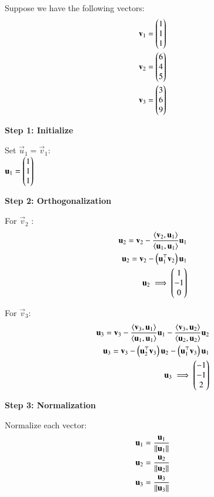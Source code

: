 \begin{enumerate}[label=\thesection.\arabic*,ref=\thesection.\theenumi]
    Suppose we have the following vectors:
    \begin{align*}
        \mathbf{v}_1 = \begin{pmatrix}1 \\1 \\1\end{pmatrix}  \\
        \mathbf{v}_2 = \begin{pmatrix}6\\ 4\\ 5\end{pmatrix}  \\
        \mathbf{v}_3 = \begin{pmatrix}3 \\6\\ 9\end{pmatrix}
    \end{align*}
        

\textbf{Step 1: Initialize}

Set $\vec{u}_1 = \vec{v}_1$:\\

 $\mathbf{u}_1 = \begin{pmatrix}1\\1\\1\end{pmatrix}$
 

\textbf{Step 2: Orthogonalization}

For  $ \vec{v}_2$ :
 \begin{align}
     \mathbf{u}_2 = \mathbf{v}_2 - \frac{\langle \mathbf{v}_2, \mathbf{u}_1 \rangle}{\langle \mathbf{u}_1, \mathbf{u}_1 \rangle} \mathbf{u}_1 \\
     \mathbf{u}_2=\mathbf{v}_2- \left(\mathbf{u}_1 ^\top \mathbf{v}_2\right) \mathbf{u}_1\\ 
     \mathbf{u}_2\implies \begin{pmatrix}1\\-1\\0\end{pmatrix}
 \end{align}

For $\vec{v}_3 $:
\begin{align}
    \mathbf{u}_3 = \mathbf{v}_3 - \frac{\langle \mathbf{v}_3, \mathbf{u}_1 \rangle}{\langle \mathbf{u}_1, \mathbf{u}_1 \rangle} \mathbf{u}_1 - \frac{\langle \mathbf{v}_3, \mathbf{u}_2 \rangle}{\langle \mathbf{u}_2, \mathbf{u}_2 \rangle} \mathbf{u}_2 \\
    \mathbf{u}_3=\mathbf{v}_3- \left(\mathbf{u}_2 ^\top \mathbf{v}_3\right) \mathbf{u}_2- \left(\mathbf{u}_1 ^\top \mathbf{v}_3\right) \mathbf{u}_1\\ 
\mathbf{u}_3\implies \begin{pmatrix}-1\\-1\\2\end{pmatrix}
\end{align}

\textbf{Step 3: Normalization}

Normalize each vector:
\begin{align}
\mathbf{u}_1 = \frac{\mathbf{u}_1}{\left\Vert\mathbf{u}_1\right\Vert} \\
\mathbf{u}_2 = \frac{\mathbf{u}_2}{\left\Vert\mathbf{u}_2\right\Vert} \\
\mathbf{u}_3 = \frac{\mathbf{u}_3}{\left\Vert\mathbf{u}_3\right\Vert} 
\end{align}


\end{enumerate}
